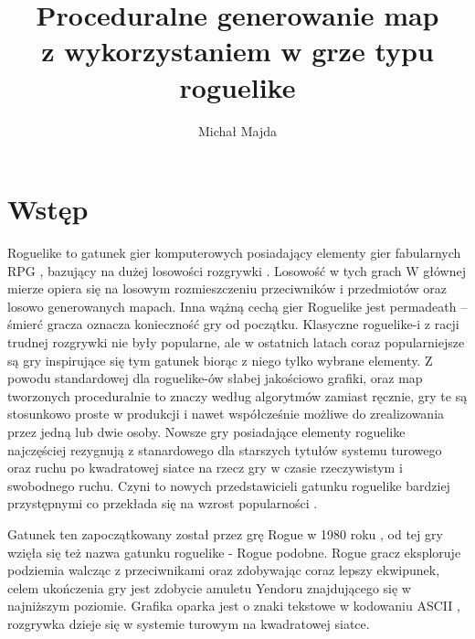 \documentclass[12pt,twoside]{article}
\author{Michał Majda}
\title{Proceduralne generowanie map \\ z wykorzystaniem w grze typu roguelike }
\begin{document}
\maketitle

\blankpage
\tableofcontents
\clearpage
\blankpage


%

\section*{Wstęp}
Roguelike to gatunek gier komputerowych posiadający elementy gier fabularnych RPG \cite{book_rpg}, bazujący na dużej losowości rozgrywki \cite{bookroguelike}. Losowość w tych grach W głównej mierze opiera się na losowym rozmieszczeniu przeciwników i przedmiotów oraz losowo generowanych mapach. Inna wążną cechą gier Roguelike jest permadeath -- śmierć gracza oznacza konieczność gry od początku. Klasyczne roguelike-i z racji trudnej rozgrywki nie były popularne, ale w ostatnich latach coraz popularniejsze są gry inspirujące się tym gatunek biorąc z niego tylko wybrane elementy. Z powodu standardowej dla roguelike-ów słabej jakościowo grafiki, oraz map tworzonych proceduralnie to znaczy według algorytmów zamiast ręcznie, gry te są stosunkowo proste w produkcji i nawet współcześnie możliwe do zrealizowania przez jedną lub dwie osoby. Nowsze gry posiadające elementy roguelike najczęściej rezygnują z stanardowego dla starszych tytułów systemu turowego oraz ruchu po kwadratowej siatce na rzecz gry w czasie rzeczywistym i swobodnego ruchu. Czyni to nowych przedstawicieli gatunku roguelike bardziej przystępnymi co przekłada się na wzrost popularności \cite{roguelike_popularity}.

Gatunek ten zapoczątkowany został przez grę Rogue w 1980 roku \cite{rogue_game}, od tej gry wzięła się też nazwa gatunku roguelike - Rogue podobne. Rogue gracz eksploruje podziemia walcząc z przeciwnikami oraz zdobywając coraz lepszy ekwipunek, celem ukończenia gry jest zdobycie amuletu Yendoru znajdującego się w najniższym poziomie. Grafika oparka jest o znaki tekstowe w kodowaniu ASCII \cite{book_ascii}, rozgrywka dzieje się w systemie turowym na kwadratowej siatce.
\end{document}
